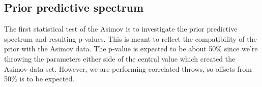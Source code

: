 
\subsection{Prior predictive spectrum}
\label{sec:Asimov_prior}
The first statistical test of the Asimov is to investigate the prior predictive spectrum and resulting p-values. This is meant to reflect the compatibility of the prior with the Asimov data. The p-value is expected to be about 50\% since we're throwing the parameters either side of the central value which created the Asimov data set. However, we are performing correlated throws, so offsets from 50\% is to be expected.

